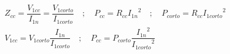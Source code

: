 \begin{gather*}
	Z_{cc}=\dfrac{V_{1cc}}{I_{1n}}=\dfrac{V_{1corto}}{I_{1corto}}\quad ; \quad P_{cc}=R_{cc} {I_{1n}}^{2}\quad ; \quad P_{corto}=R_{cc} {I_{1corto}}^{2}\\
	V_{1cc}=V_{1corto}\dfrac{I_{1n}}{I_{1corto}}\quad;\quad P_{cc}=P_{corto}\dfrac{{I_{1n}}^{2}}{{I_{1corto}}^{2}}
\end{gather*}
